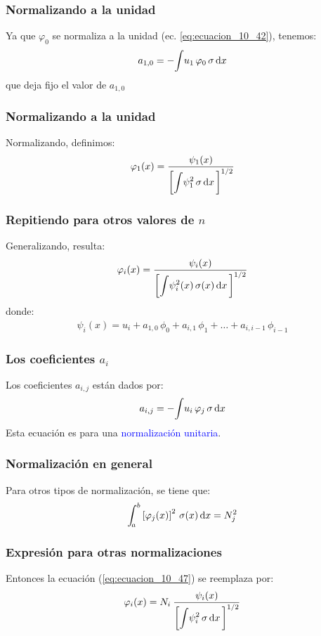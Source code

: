 \documentclass[12pt]{beamer}
\begin{document}
\begin{frame}
\frametitle{Normalizando a la unidad}
Ya que $\varphi_{0}$ se normaliza a la unidad (ec. \ref{eq:ecuacion_10_42}), tenemos:
\pause
\begin{align}
a_{1,0} = - \scaleint{5ex} u_{1} \, \varphi_{0} \, \sigma \dd{x}
\label{eq:ecuacion_10_45}
\end{align}
que deja fijo el valor de $a_{1, 0}$
\end{frame}
\begin{frame}
\frametitle{Normalizando a la unidad}
Normalizando, definimos:
\pause
\begin{align}
\varphi_{1} (x) = \dfrac{\psi_{1} (x)}{ \bigg[ \displaystyle \scaleint{5ex} \psi_{1}^{2} \, \sigma \dd{x} \bigg]^{1/2}}
\label{eq:ecuacion_10_46}
\end{align}
\end{frame}
\begin{frame}
\frametitle{Repitiendo para otros valores de $n$}
Generalizando, resulta:
\pause
\begin{align}
\varphi_{i} (x) = \dfrac{\psi_{i} (x)}{ \bigg[ \displaystyle \scaleint{5ex} \psi_{i}^{2} (x) \, \sigma (x) \dd{x} \bigg]^{1/2}}
\label{eq:ecuacion_10_47}
\end{align}
\pause
donde:
\pause
\begin{align}
\psi_{i}(x) = u_{i} + a_{1, 0} \, \phi_{0} + a_{i, 1} \, \phi_{1} + \ldots + a_{i, i-1} \, \phi_{i-1}
\label{eq:ecuacion_10_48}
\end{align}
\end{frame}
\begin{frame}
\frametitle{Los coeficientes $a_{i}$}
Los coeficientes $a_{i, j}$ están dados por:
\pause
\begin{align}
a_{i, j} = - \scaleint{5ex} u_{i} \, \varphi_{j} \, \sigma  \dd{x}
\label{eq:ecuacion_10_49}
\end{align}
Esta ecuación es para una \textcolor{blue}{normalización unitaria}.
\end{frame}
\begin{frame}
\frametitle{Normalización en general}
Para otros tipos de normalización, se tiene que:
\pause
\begin{align*}
\scaleint{5ex}_{\bs a}^{b} \left[ \varphi_{j} (x) \right]^{2} \, \sigma (x) \dd{x} =  N_{j}^{2}
\end{align*}
\end{frame}
\begin{frame}
\frametitle{Expresión para otras normalizaciones}
Entonces la ecuación (\ref{eq:ecuacion_10_47}) se reemplaza por:
\pause
\begin{align}
\varphi_{i} (x) =  N_{i} \: \dfrac{\psi_{i} (x)}{ \bigg[ \displaystyle \scaleint{5ex} \psi_{i}^{2} \, \sigma \dd{x} \bigg]^{1/2}}
\label{eq:ecuacion_10_47a}
\end{align}
\end{frame}
\end{document}
